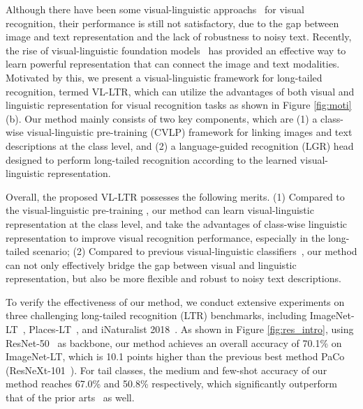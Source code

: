 \documentclass[runningheads]{llncs}
\begin{document}
Although there have been some visual-linguistic approachs~\cite{he2017fine,zhuang2020wildfish++,mu2019shaping} for visual recognition, their performance is still not satisfactory, due to the gap between image and text representation and the lack of robustness to noisy text.
Recently, the rise of visual-linguistic foundation models~\cite{clip,su2019vl,jia2021scaling} has provided an effective way to learn powerful representation that can connect the image and text modalities.
Motivated by this, we present a visual-linguistic framework for long-tailed recognition, termed VL-LTR, which can utilize the advantages of both visual and linguistic representation for visual recognition tasks as shown in Figure \ref{fig:moti} (b).
Our method mainly consists of two key components, which are (1) a class-wise visual-linguistic pre-training (CVLP) framework for linking images and text descriptions at the class level, and (2) a language-guided recognition (LGR) head designed to perform long-tailed recognition according to the learned visual-linguistic representation.

Overall, the proposed VL-LTR possesses the following merits. (1) Compared to
the visual-linguistic pre-training \cite{cui2021parametric,zhang2021test,cui2021reslt,wang2020long,kang2019decoupling}, our method can learn visual-linguistic
representation at the class level, and take the advantages of class-wise linguistic representation to improve visual recognition performance, especially in the long-tailed scenario;
(2) Compared to previous visual-linguistic classifiers~\cite{he2017fine,zhuang2020wildfish++,mu2019shaping}, our method can not only effectively bridge the gap between visual and linguistic representation, but also be more flexible and robust to noisy text descriptions.


To verify the effectiveness of our method, we conduct extensive experiments on three challenging long-tailed recognition (LTR) benchmarks, including ImageNet-LT~\cite{liu2019large}, Places-LT~\cite{liu2019large}, and iNaturalist 2018~\cite{van2018inaturalist}. 
As shown in Figure \ref{fig:res_intro}, using ResNet-50~\cite{he2016deep} as backbone, our method achieves an overall accuracy of 70.1\% on ImageNet-LT, which is 10.1 points higher than the previous best method PaCo~\cite{cui2021parametric} (ResNeXt-101~\cite{xie2017aggregated}).
For tail classes, the medium and few-shot accuracy of our method reaches 67.0\% and 50.8\% respectively, which significantly outperform that of the prior arts~\cite{cui2021parametric,zhang2021test,cui2021reslt,wang2020long} as well.
\end{document}
